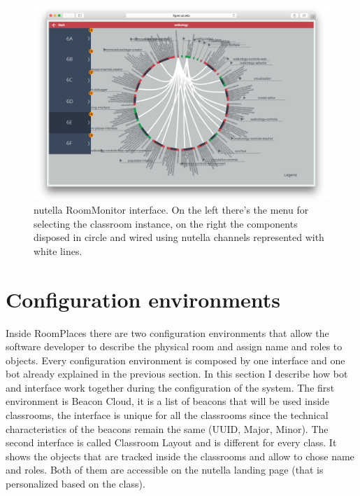 \begin{figure}
\centering
\includegraphics[width=6in]{images/nutella-monitor.png}
\caption{nutella RoomMonitor interface. On the left there's the menu for selecting the classroom instance, on the right the components disposed in circle and wired using nutella channels represented with white lines.}
\label{fig:nutella_monitor}
\end{figure}

\section{Configuration environments}
Inside RoomPlaces there are two configuration environments that allow the software developer to describe the physical room and assign name and roles to objects. Every configuration environment is composed by one interface and one bot already explained in the previous section. In this section I describe how bot and interface work together during the configuration of the system. The first environment is Beacon Cloud, it is a list of beacons that will be used inside classrooms, the interface is unique for all the classrooms since the technical characteristics of the beacons remain the same (UUID, Major, Minor). The second interface is called Classroom Layout and is different for every class. It shows the objects that are tracked inside the classrooms and allow to chose name and roles. Both of them are accessible on the nutella landing page (that is personalized based on the class).

